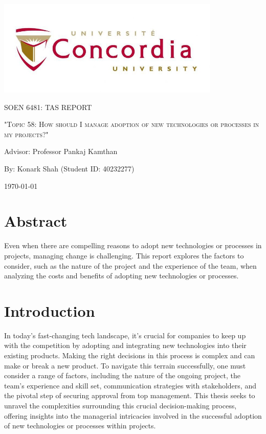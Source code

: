 \documentclass{article}
\begin{document}
\begin{titlepage}
    \centering
    \includegraphics[width=0.8\textwidth]{image.jpeg}\par %
     \vspace{2cm}
    {\scshape\Large SOEN 6481: TAS REPORT \par}
    \vspace{1.5cm}
    {\scshape\Huge "Topic 58: How should I manage adoption of new technologies or processes in my projects?"\par}
    \vspace{1.5cm}
    {\large Advisor: Professor Pankaj Kamthan\par}
    \vspace{1.5cm}
    {\large By: Konark Shah (Student ID: 40232277)\par}
    \vspace{1cm}
    {\large \today\par}
\end{titlepage}



\tableofcontents

\newpage

\section{Abstract}
Even when there are compelling reasons to adopt new technologies or processes in projects, managing change is challenging. This report explores the factors to consider, such as the nature of the project and the experience of the team, when analyzing the costs and benefits of adopting new technologies or processes.

\section{Introduction}
In today's fast-changing tech landscape, it's crucial for companies to keep up with the competition by adopting and integrating new technologies into their existing products. Making the right decisions in this process is complex and can make or break a new product. To navigate this terrain successfully, one must consider a range of factors, including the nature of the ongoing project, the team's experience and skill set, communication strategies with stakeholders, and the pivotal step of securing approval from top management. This thesis seeks to unravel the complexities surrounding this crucial decision-making process, offering insights into the managerial intricacies involved in the successful adoption of new technologies or processes within projects.
\end{document}
